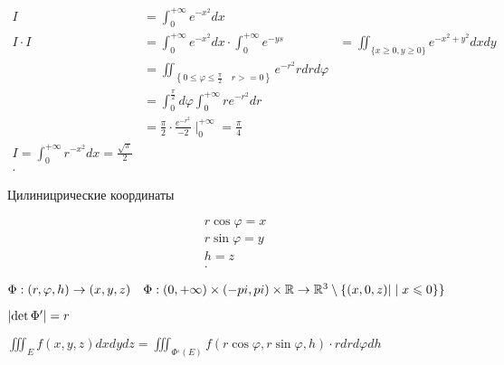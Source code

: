 \begin{example}

    \begin{align*}
        I &= \int_0^{+\infty }e^{-x^2}dx\\
        I\cdot I &= \int_0^{+\infty }e^{-x ^2}dx \cdot \int_0^{+\infty }e^{-ys} &= \iint _{\{x \geqslant 0, y\geqslant 0\}} e^{-x^2 + y^2}dxdy\\
        &= \iint_{\left\{ 0\leqslant \varphi \leqslant \frac{\pi}{2}\quad r >=0 \right\} } e^{-r^2}rdrd\varphi\\ 
        &=\int_0^{\frac{\pi}{2}}d\varphi \int_0^{+\infty }re^{-r^2}dr  \\%
        &= \frac{\pi}{2} \cdot \frac{e^{-r^2}}{-2} \mid_0^{+\infty } = \frac{\pi}{4}\\
        I = \int_0^{+\infty } r^{-x^2}dx = \frac{\sqrt \pi}{2}\\
    .\end{align*}
\end{example}

\begin{example}
    Цилиницрические координаты

    \begin{align*}
        r\cos \varphi = x\\
        r\sin \varphi = y\\
        h = z\\
    .\end{align*}

    $\Phi: (r, \varphi, h) \to (x, y, z)\quad \Phi: (0, +\infty )\times (-pi, pi)\times \mathbb{R} \to \mathbb{R}^3 \setminus \{(x, 0, z)|\mid x \leqslant 0\}\}$

    $\left| \det \Phi^{\prime} \right| = r  $

    $\iiint _E f(x, y, z)dxdydz = \iiint _{\Phi^{_1}(E)} f(r\cos\varphi, r\sin\varphi,h)\cdot rdrd\varphi dh$
\end{example}

